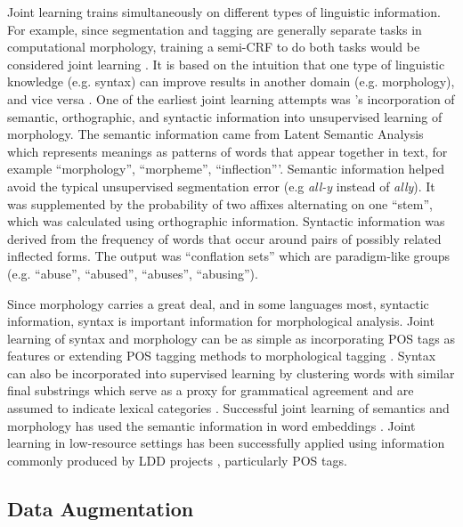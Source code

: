 \documentclass[12pt]{article}
\begin{document}
Joint learning trains simultaneously on different types of linguistic information. For example, since segmentation and tagging are generally separate tasks in computational morphology, training a semi-CRF to do both tasks would be considered joint learning \cite{cotterell_labeled_2015}. It is based on the intuition that one type of linguistic knowledge (e.g. syntax) can improve results in another domain (e.g. morphology), and vice versa \cite{goldsmith_computational_2017}. One of the earliest joint learning attempts was 's incorporation of semantic, orthographic, and syntactic information into unsupervised learning of morphology. The semantic information came from Latent Semantic Analysis which represents meanings as patterns of words that appear together in text, for example ``morphology'', ``morpheme'', ``inflection'''. Semantic information helped avoid the typical unsupervised segmentation error (e.g \textit{all-y} instead of \textit{ally}). It was supplemented by the probability of two affixes alternating on one ``stem'', which was calculated using orthographic information. Syntactic information was derived from the frequency of words that occur around pairs of possibly related inflected forms. The output was ``conflation sets'' which are paradigm-like groups (e.g. ``abuse'', ``abused'', ``abuses'', ``abusing'').
 
Since morphology carries a great deal, and in some languages most, syntactic information, syntax is important information for morphological analysis. Joint learning of syntax and morphology can be as simple as incorporating POS tags as features or extending POS tagging methods to morphological tagging \cite{buys_cross-lingual_2016,cotterell_cross-lingual_2017}. Syntax can also be incorporated into supervised learning by clustering words with similar final substrings which serve as a proxy for grammatical agreement and are assumed to indicate lexical categories \cite{lee_modeling_2011}. Successful joint learning of semantics and morphology has used the semantic information in word embeddings \cite{soricut_unsupervised_2015}. Joint learning in low-resource settings has been successfully applied using information commonly produced by LDD projects \cite{palmer_semi-automated_2009,moeller_automatic_2018}, particularly POS tags.

\subsection{Data Augmentation}
\label{augment}
\end{document}
